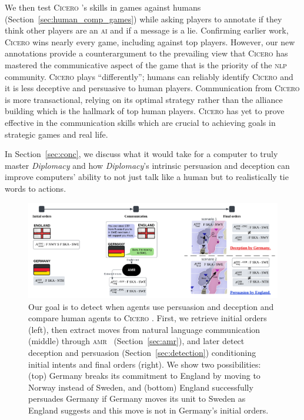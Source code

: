 \documentclass[oneside]{memoir}
\newcommand{\cicero}{\abr{Cicero} }
\newcommand{\abr}[1]{\textsc{#1}}
\begin{document}
We then test \cicero{}'s skills in games against humans
(Section~\ref{sec:human_comp_games}) while asking players to annotate if
they think other players are an \abr{ai} and if a message is a lie.
%
Confirming earlier work, \cicero{} wins nearly every game, including
against top players.
%
However, our new annotations provide a counterargument to the
prevailing view that \cicero{} has mastered the communicative aspect of the game that is the priority of the \abr{nlp} community.
%
\cicero{} plays ``differently''; humans can reliably identify
\cicero{} and it is less deceptive and persuasive to human players.
%
Communication from \cicero{} is more transactional, relying on its
optimal strategy rather than the alliance building which is the hallmark of top human players.
%
\cicero{} has yet to prove effective in the communication skills which are crucial to achieving goals in strategic games and real life.

In Section~\ref{sec:conc}, we discuss what it would take for a computer to truly master
\textit{Diplomacy} and how  \textit{Diplomacy}'s intrinsic persuasion and deception can
improve computers' ability to not just talk like a human but to realistically tie words to actions.

\begin{figure}[t]
    \centering
    \includegraphics[width=\textwidth]{figures/dec_per_motivating_example.pdf}
    \caption{Our goal is to detect when agents use persuasion and deception and compare human agents to \cicero. First, we retrieve initial orders (left), then extract
      moves from natural language communication (middle) through \abr{amr}
      \ (Section~\ref{sec:amr}), and
      later detect deception and persuasion
      (Section~\ref{sec:detection}) conditioning initial intents and
      final orders (right). We show two possibilities: (top)
      Germany breaks its commitment to England by moving to Norway
      instead of Sweden, and (bottom) England successfully persuades
      Germany if Germany moves its unit to Sweden as England suggests
      and this move is not in Germany's initial orders.}
    \label{fig:dec_per_example}

\end{figure}
\end{document}
